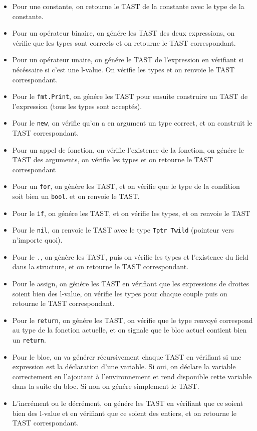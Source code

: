 \documentclass[10pt]{report}
\begin{document}
\begin{itemize}
  \item Pour une constante, on retourne le TAST de la constante avec le type de la constante.
  \item Pour un opérateur binaire, on génére les TAST des deux expressions, on vérifie que les types sont corrects et on retourne le TAST correspondant.
  \item Pour un opérateur unaire, on génére le TAST de l'expression en vérifiant si nécéssaire si c'est une l-value. On vérifie les types et on renvoie le TAST correspondant.
  \item Pour le \verb|fmt.Print|, on génére les TAST pour ensuite construire un TAST de l'expression (tous les types sont acceptés).
  \item Pour le \verb|new|, on vérifie qu'on a en argument un type correct, et on construit le TAST correspondant.
  \item Pour un appel de fonction, on vérifie l'existence de la fonction, on génére le TAST des arguments, on vérifie les types et on retourne le TAST correspondant
  \item Pour un \verb|for|, on génére les TAST, et on vérifie que le type de la condition soit bien un \verb|bool|. et on renvoie le TAST.
  \item Pour le \verb|if|, on génére les TAST, et on vérifie les types, et on renvoie le TAST
  \item Pour le \verb|nil|, on renvoie le TAST avec le type \verb|Tptr Twild| (pointeur vers n'importe quoi).
  \item Pour le \verb|.|, on génère les TAST, puis on vérifie les types et l'existence du field dans la structure, et on retourne le TAST correspondant.
  \item Pour le assign, on génére les TAST en vérifiant que les expressions de droites soient bien des l-value, on vérifie les types pour chaque couple puis on retourne le TAST correspondant.
  \item Pour le \verb|return|, on génére les TAST, on vérifie que le type renvoyé correspond au type de la fonction actuelle, et on signale que le bloc actuel contient bien un \verb|return|.
  \item Pour le bloc, on va générer récursivement chaque TAST en vérifiant si une expression est la déclaration d'une variable. Si oui, on déclare la variable correctement en l'ajoutant à l'environnement et rend disponible cette variable dans la suite du bloc. Si non on génére simplement le TAST.
  \item L'incrément ou le décrément, on génére les TAST en vérifiant que ce soient bien des l-value et en vérifiant que ce soient des entiers, et on retourne le TAST correspondant.
\end{itemize}
\end{document}
